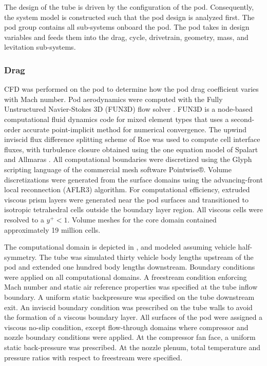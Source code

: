 
	 The design of the tube is driven by the configuration of the pod.
	 Consequently, the system model is constructed such that the pod design is analyzed first.
	 The pod group contains all sub-systems onboard the pod.
	 The pod takes in design variables and feeds them into the drag, cycle,
	 drivetrain, geometry, mass, and levitation sub-systems.

\subsubsection{Drag}
	CFD was performed on the pod to determine how the pod drag coefficient varies with Mach number.
	Pod aerodynamics were computed with the Fully Unstructured Navier-Stokes 3D
	(FUN3D) flow solver \cite{Biedron}. FUN3D is a node-based computational fluid dynamics
	code for mixed element types that uses a second-order accurate point-implicit
	method for numerical convergence. The upwind inviscid flux difference
	splitting scheme of Roe \cite{Roe} was used to compute cell interface fluxes,
	with turbulence closure obtained using the one equation model of Spalart
	and Allmaras \cite{Spalart}.
	All computational boundaries were discretized using the Glyph scripting
	language of the commercial mesh software Pointwise®. Volume discretizations
	were generated from the surface domains using the advancing-front local
	reconnection (AFLR3)\cite{Marcum} algorithm. For computational efficiency, extruded
	viscous prism layers were generated near the pod surfaces and transitioned
	to isotropic tetrahedral cells outside the boundary layer region.
	All viscous cells were resolved to a $y^{+} < 1$. Volume meshes for the core
	domain contained approximately 19 million cells.

	The computational domain is depicted in ,
	and modeled assuming vehicle half-symmetry.
	The tube was simulated thirty vehicle body lengths upstream of the pod
	and extended one hundred body lengths downstream. Boundary conditions were
	applied on all computational domains. A freestream condition enforcing Mach
	number and static air reference properties was specified at the tube inflow boundary.
	A uniform static backpressure was specified on the tube downstream exit.
	An inviscid boundary condition was prescribed on the tube walls to avoid
	the formation of a viscous boundary layer. All surfaces of the pod were
	assigned a viscous no-slip condition, except flow-through domains where
	compressor and nozzle boundary conditions were applied. At the compressor
	fan face, a uniform static back-pressure was prescribed. At the nozzle plenum,
	total temperature and pressure ratios with respect to freestream were specified.


